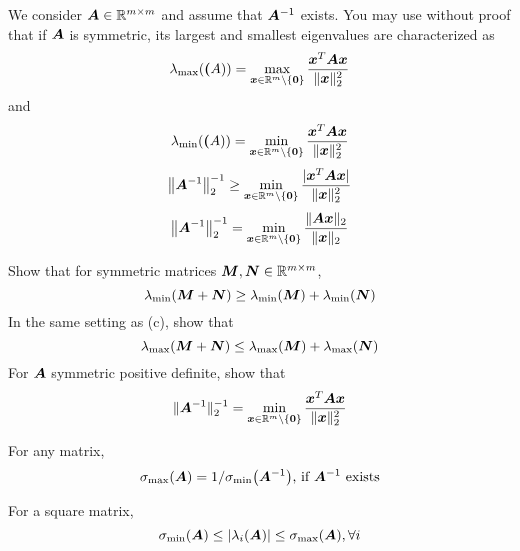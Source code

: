 \documentclass[twoside,10pt]{article}
\begin{document}
We consider $\bm{A} \in \mathbb{R}^{m \times m}$ and assume that $\bm{A}^{-1}$ exists. 
You may use without proof that if $\bm{A}$ is symmetric, its largest and smallest eigenvalues are characterized as 
\begin{equation*}
   \lambda_{\mathrm{max}}\left(\mtx(A)\right) = \max \limits_{\vct{x} \in \R^m \setminus \{\vct{0}\}} \frac{\vct{x}^T \mtx{A}\vct{x}}{\|\vct{x}\|_2^2}
\end{equation*}
and 
\begin{equation*}
   \lambda_{\mathrm{min}}\left(\mtx(A)\right) = \min \limits_{\vct{x} \in \R^m \setminus \{\vct{0}\}} \frac{\vct{x}^T \mtx{A}\vct{x}}{\|\vct{x}\|_2^2}
\end{equation*}
\begin{equation}
  \left\|\mtx{A}^{-1}\right\|_2^{-1} \geq \min \limits_{\vct{x} \in \R^m \setminus \{\vct{0}\}} \frac{|\vct{x}^T \mtx{A}\vct{x}|}{\|\vct{x}\|_2^2}
\end{equation}
\begin{equation}
  \left\|\mtx{A}^{-1}\right\|_2^{-1} = \min \limits_{\vct{x} \in \R^m \setminus \{\vct{0}\}} \frac{\|\mtx{A}\vct{x}\|_2}{\|\vct{x}\|_2}
\end{equation}

Show that for symmetric matrices $\bm{M}, \bm{N} \in \mathbb{R}^{m \times m}$, 
\begin{equation}
  \lambda_{\mathrm{min}}(\mtx{M} + \mtx{N}) \geq \lambda_{\mathrm{min}}\left(\mtx{M}\right) + \lambda_{\mathrm{min}}\left(\mtx{N}\right)
\end{equation}
In the same setting as (c), show that 
\begin{equation}
  \lambda_{\mathrm{max}}(\mtx{M} + \mtx{N}) \leq \lambda_{\mathrm{max}}\left(\mtx{M}\right) + \lambda_{\mathrm{max}}\left(\mtx{N}\right)
\end{equation}
For $\bm{A}$ symmetric positive definite, show that 
\begin{equation*}
  \|\bm{A}^{-1}\|_{2}^{-1} = \min \limits_{\bm{x} \in \mathbb{R}^m \setminus \{\bm{0}\}} \frac{\bm{x}^T \bm{A} \bm{x}}{\|\bm{x}\|^2_2}
\end{equation*}

For any matrix,
\begin{equation*}
  \sigma_{\mathrm{max}}\left(\mtx{A}\right) = 1 / \sigma_{\mathrm{min}}\left(\mtx{A}^{-1}\right)\text{, if $\mtx{A}^{-1}$ exists}
\end{equation*}

For a square matrix,
\begin{equation*}
  \sigma_{\mathrm{min}}(\mtx{A}) \leq \left|\lambda_{i}\left(\mtx{A}\right)\right| \leq \sigma_{\mathrm{max}}\left(\mtx{A}\right), \forall i 
\end{equation*}
\end{document}
